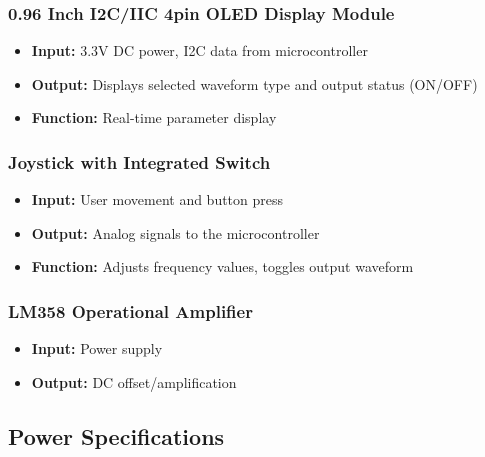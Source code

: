 \documentclass[12pt,a4paper]{article}
\begin{document}
\subsubsection{0.96 Inch \gls{I2C}/IIC 4pin OLED Display Module}
    \begin{itemize}
        \item \textbf{Input:} 3.3V DC power, I2C data from microcontroller
        \item \textbf{Output:} Displays selected waveform type and output status (ON/OFF)
        \item \textbf{Function:} Real-time parameter display
    \end{itemize}
    
\subsubsection{Joystick with Integrated Switch}
    \begin{itemize}
        \item \textbf{Input:} User movement and button press
        \item \textbf{Output:} Analog signals to the microcontroller
        \item \textbf{Function:} Adjusts frequency values, toggles output waveform
    \end{itemize}
    
\subsubsection{\gls{LM358} Operational Amplifier}
\begin{itemize}
    \item \textbf{Input:} Power supply
    \item \textbf{Output:} DC offset/amplification
\end{itemize}
    
\subsection{Power Specifications}
\end{document}
